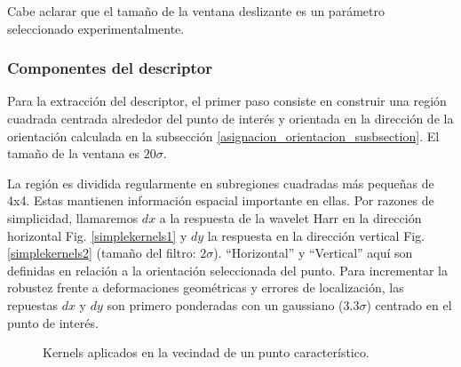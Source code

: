 \documentclass[a4paper,11pt,spanish]{article}
\begin{document}
%

Cabe aclarar que el tamaño de la ventana deslizante es un parámetro seleccionado experimentalmente.
\subsubsection{Componentes del descriptor}
Para la extracción del descriptor, el primer paso consiste en construir una región cuadrada centrada alrededor del punto de interés y orientada en la dirección de la orientación calculada en la subsección \ref{asignacion_orientacion_susbsection}. El tamaño de la ventana es $20\sigma$.



La región es dividida regularmente en subregiones cuadradas más pequeñas de 4x4. Estas mantienen información espacial importante en ellas. 
Por razones de simplicidad, llamaremos $dx$ a la respuesta de la wavelet Harr en la dirección horizontal Fig. \ref{simplekernels1} y $dy$ la respuesta en la dirección vertical Fig. \ref{simplekernels2} (tamaño del filtro: $2\sigma$). ``Horizontal'' y ``Vertical'' aquí son definidas en relación a la orientación seleccionada del punto. Para incrementar la robustez frente a deformaciones geométricas y errores de localización, las repuestas $dx$ y $dy$ son primero ponderadas con un gaussiano ($3.3\sigma$) centrado en el punto de interés.

\begin{figure}[tbhp]
   \centering
   \hspace{0.1\linewidth}
    \caption{Kernels aplicados en la vecindad de un punto característico.}
   \label{simplekernels}                %
\end{figure}
\end{document}
